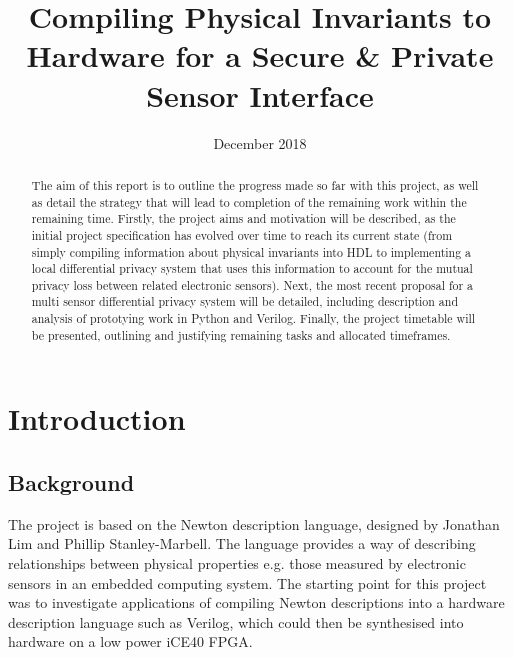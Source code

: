 \documentclass[pageno]{jpaper}
\begin{document}
\title{
Compiling Physical Invariants to Hardware for a Secure \& Private Sensor Interface}

\date{December 2018}
\maketitle

\thispagestyle{empty}

\begin{abstract}

The aim of this report is to outline the progress made so far with this project, as well as detail the strategy that will lead to completion of the remaining work within the remaining time. Firstly, the project aims and motivation will be described, as the initial project specification has evolved over time to reach its current state (from simply compiling information about physical invariants into HDL to implementing a local differential privacy system that uses this information to account for the mutual privacy loss between related electronic sensors). Next, the most recent proposal for a multi sensor differential privacy system will be detailed, including description and analysis of prototying work in Python and Verilog. Finally, the project timetable will be presented, outlining and justifying remaining tasks and allocated timeframes.

\end{abstract}

\section{Introduction}
\subsection{Background}

The project is based on the Newton description language, designed by Jonathan Lim and Phillip Stanley-Marbell\cite{Newton}. The language provides a way of describing relationships between physical properties e.g. those measured by electronic sensors in an embedded computing system. The starting point for this project was to investigate applications of compiling Newton descriptions into a hardware description language such as Verilog, which could then be synthesised into hardware on a low power iCE40\cite{iCE40} FPGA.
\end{document}
